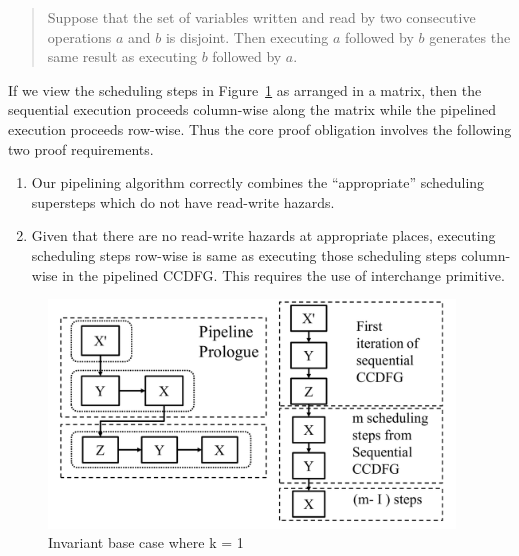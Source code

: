 \begin{quote}
Suppose that the
set of variables written and read by two consecutive
operations $a$ and $b$ is disjoint.  Then executing $a$
followed by $b$ generates the same result as executing $b$
followed by $a$.
\end{quote}

If we view the scheduling steps in
Figure~\ref{fig:invariant-base-case} as arranged in a
matrix, then the sequential execution proceeds column-wise
along the matrix while the pipelined execution proceeds
row-wise.  Thus the core proof obligation involves the
following two proof requirements.

\begin{enumerate}[--]
\item Our pipelining algorithm correctly combines the
  ``appropriate'' scheduling supersteps which do not have
  read-write hazards.
\item Given that there are no read-write hazards at
  appropriate places, executing scheduling steps row-wise is
  same as executing those scheduling steps column-wise in
  the pipelined CCDFG.  This requires the use of interchange primitive.
\end{enumerate}

\begin{figure}[t!]
\begin{center}
\includegraphics[width=4.25in]{fig-proposal/invariant-base-case}
\end{center}
\caption{Invariant base case where k = 1}
\label{fig:invariant-base-case}
\end{figure}

